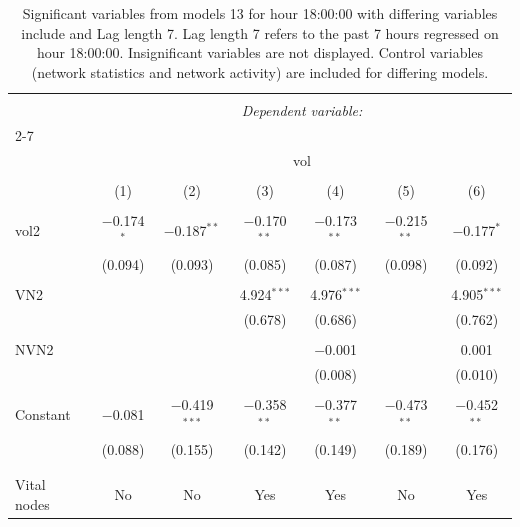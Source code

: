 
\begin{table}[!htbp] \centering 
  \caption{Significant variables from models 13 for hour 18:00:00 with differing variables include 
                               and Lag length 7. Lag length 7 refers to the past 7 hours regressed on hour 18:00:00. 
                               Insignificant variables are not displayed. 
                               Control variables (network statistics and network activity) are 
                               included for differing models.} 
  \label{Volumemodels1_t_hourlagged5} 
\scriptsize 
\begin{tabular}{@{\extracolsep{5pt}}lcccccc} 
\\[-1.8ex]\hline 
\hline \\[-1.8ex] 
 & \multicolumn{6}{c}{\textit{Dependent variable:}} \\ 
\cline{2-7} 
\\[-1.8ex] & \multicolumn{6}{c}{vol} \\ 
\\[-1.8ex] & (1) & (2) & (3) & (4) & (5) & (6)\\ 
\hline \\[-1.8ex] 
 vol2 & $-$0.174$^{*}$ & $-$0.187$^{**}$ & $-$0.170$^{**}$ & $-$0.173$^{**}$ & $-$0.215$^{**}$ & $-$0.177$^{*}$ \\ 
  & (0.094) & (0.093) & (0.085) & (0.087) & (0.098) & (0.092) \\ 
  & & & & & & \\ 
 VN2 &  &  & 4.924$^{***}$ & 4.976$^{***}$ &  & 4.905$^{***}$ \\ 
  &  &  & (0.678) & (0.686) &  & (0.762) \\ 
  & & & & & & \\ 
 NVN2 &  &  &  & $-$0.001 &  & 0.001 \\ 
  &  &  &  & (0.008) &  & (0.010) \\ 
  & & & & & & \\ 
 Constant & $-$0.081 & $-$0.419$^{***}$ & $-$0.358$^{**}$ & $-$0.377$^{**}$ & $-$0.473$^{**}$ & $-$0.452$^{**}$ \\ 
  & (0.088) & (0.155) & (0.142) & (0.149) & (0.189) & (0.176) \\ 
  & & & & & & \\ 
\hline \\[-1.8ex] 
Vital nodes & No & No & Yes & Yes & No & Yes \\ 

\end{tabular}
\end{table}
